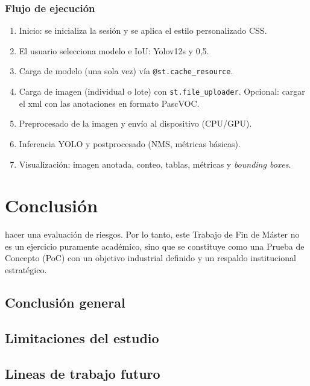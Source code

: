 \documentclass[12pt,a4paper,onecolumn,oneside]{report}
\begin{document}
\subsection{Flujo de ejecución}
\begin{enumerate}
  \item Inicio: se inicializa la sesión y se aplica el estilo personalizado CSS.
  \item El usuario selecciona modelo e IoU: Yolov12s y 0,5.
  \item Carga de modelo (una sola vez) vía \texttt{@st.cache\_resource}.
  \item Carga de imagen (individual o lote) con \texttt{st.file\_uploader}. Opcional: cargar el xml con las anotaciones en formato PascVOC.
  \item Preprocesado de la imagen y envío al dispositivo (CPU/GPU).
  \item Inferencia YOLO y postprocesado (NMS, métricas básicas).
  \item Visualización: imagen anotada, conteo, tablas, métricas y \textit{bounding boxes}.
\end{enumerate}


\chapter{Conclusión} %
hacer una evaluación de riesgos.
Por lo tanto, este Trabajo de Fin de Máster no es un ejercicio puramente académico, sino que se constituye como una Prueba de Concepto (PoC) con un objetivo industrial definido y un respaldo institucional estratégico.
\section{Conclusión general}
\label{sec:Conclusión general}
\section{Limitaciones del estudio}
\label{sec:Limitaciones del estudio}
\section{Lineas de trabajo futuro}
\label{sec:Lineas de trabajo futuro}

\renewcommand\bibname{Bibliografía}

\nocite{*}

\end{document}
